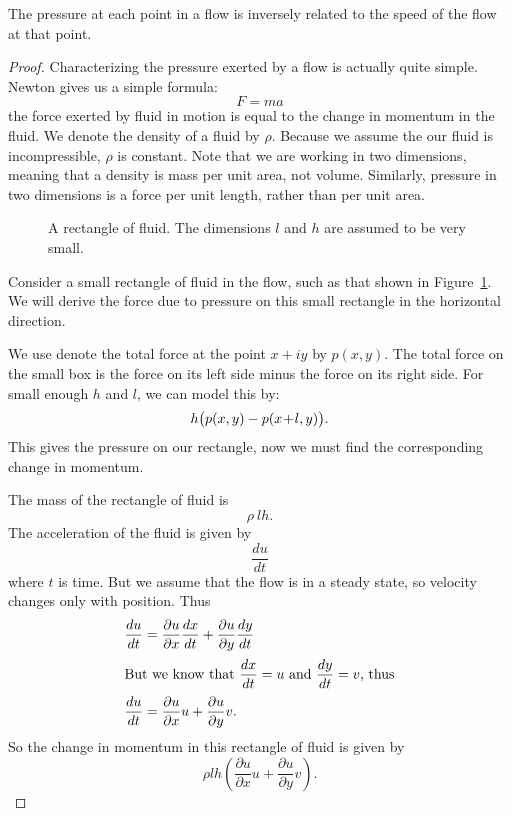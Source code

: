\documentclass[letterpaper, twoside, 12 pt]{article}
\begin{document}
	\begin{theorem}
		The pressure at each point in a flow is inversely related to the speed of the flow at that point.
	\end{theorem}
	\begin{proof}
		Characterizing the pressure exerted by a flow is actually quite simple.
		Newton gives us a simple formula:
		\[
			F = ma
		\]
		the force exerted by fluid in motion is equal to the change in momentum in the fluid.
		We denote the density of a fluid by $\rho$.
		Because we assume the our fluid is incompressible, $\rho$ is constant.
		Note that we are working in two dimensions, meaning that a density is mass per unit area, not volume.
		Similarly, pressure in two dimensions is a force per unit length, rather than per unit area.


		\begin{figure}[H]
			\centering
			\begin{tikzpicture}
				
			\end{tikzpicture}
			\captionsetup{width = 0.5 \textwidth}
			\caption{
				A rectangle of fluid.
				The dimensions $l$ and $h$ are assumed to be very small.
			}
			\label{fig:pressure_rectangle}
		\end{figure}

		Consider a small rectangle of fluid in the flow, such as that shown in Figure~\ref{fig:pressure_rectangle}.
		We will derive the force due to pressure on this small rectangle in the horizontal direction.
		
		We use denote the total force at the point $x + iy$ by $p(x, y)$.
		The total force on the small box is the force on its left side minus the force on its right side.
		For small enough $h$ and $l$, we can model this by:
		\[
			h \big( p(x, y) - p(x \tp l, y) \big).
		\]
		This gives the pressure on our rectangle, now we must find the corresponding change in momentum.

		The mass of the rectangle of fluid is
		\[
			\rho \> lh.
		\]
		The acceleration of the fluid is given by 
		\[
			\frac{du}{dt}
		\]
		where $t$ is time.
		But we assume that the flow is in a steady state, so velocity changes only with position.
		Thus
		\begin{align*}
		\frac{du}{dt} &= \frac{\partial u}{\partial x} \frac{dx}{dt} + \frac{\partial u}{\partial y} \frac{dy}{dt} \\
		\intertext{But we know that $\displaystyle\frac{dx}{dt} = u$ and $\displaystyle\frac{dy}{dt} = v$, thus}
		\frac{du}{dt} &= \frac{\partial u}{\partial x} u + \frac{\partial u}{\partial y} v.
		\end{align*}
		So the change in momentum in this rectangle of fluid is given by
		\[
			\rho lh \left( \frac{\partial u}{\partial x} u + \frac{\partial u}{\partial y} v \right).
		\]


\end{proof}
\end{document}
